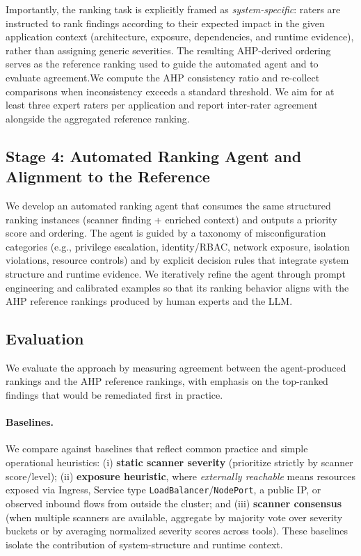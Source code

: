 \documentclass[12pt]{article}
\begin{document}
Importantly, the ranking task is explicitly framed as \emph{system-specific}: raters are instructed to rank findings according to their expected impact in the given application context (architecture, exposure, dependencies, and runtime evidence), rather than assigning generic severities. The resulting AHP-derived ordering serves as the reference ranking used to guide the automated agent and to evaluate agreement.We compute the AHP consistency ratio and re-collect comparisons when inconsistency exceeds a standard threshold. We aim for at least three expert raters per application and report inter-rater agreement alongside the aggregated reference ranking.


\subsection{Stage 4: Automated Ranking Agent and Alignment to the Reference}
\label{subsec:stage4}

We develop an automated ranking agent that consumes the same structured ranking instances (scanner finding + enriched context) and outputs a priority score and ordering. The agent is guided by a taxonomy of misconfiguration categories (e.g., privilege escalation, identity/RBAC, network exposure, isolation violations, resource controls) and by explicit decision rules that integrate system structure and runtime evidence. We iteratively refine the agent through prompt engineering and calibrated examples so that its ranking behavior aligns with the AHP reference rankings produced by human experts and the LLM.

\subsection{Evaluation}
\label{subsec:evaluation}

We evaluate the approach by measuring agreement between the agent-produced rankings and the AHP reference rankings, with emphasis on the top-ranked findings that would be remediated first in practice.

\paragraph{Baselines.}
We compare against baselines that reflect common practice and simple operational heuristics: (i) \textbf{static scanner severity} (prioritize strictly by scanner score/level); (ii) \textbf{exposure heuristic}, where \emph{externally reachable} means resources exposed via Ingress, Service type \texttt{LoadBalancer}/\texttt{NodePort}, a public IP, or observed inbound flows from outside the cluster; and (iii) \textbf{scanner consensus} (when multiple scanners are available, aggregate by majority vote over severity buckets or by averaging normalized severity scores across tools). These baselines isolate the contribution of system-structure and runtime context.
\end{document}
